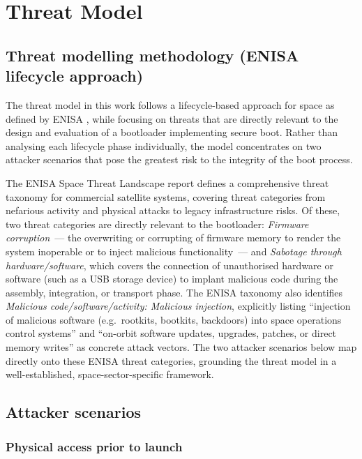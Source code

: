 \chapter{Threat Model}
\label{chapter:threatModel}

\section{Threat modelling methodology (ENISA lifecycle approach)}
\label{section:threatModel-methodology}

The threat model in this work follows a lifecycle-based approach for space as defined by ENISA \cite{enisa_2025}, while focusing on threats that are directly relevant to the design and evaluation of a bootloader implementing secure boot. Rather than analysing each lifecycle phase individually, the model concentrates on two attacker scenarios that pose the greatest risk to the integrity of the boot process.

The ENISA Space Threat Landscape report \cite{enisa_2025} defines a comprehensive threat taxonomy for commercial satellite systems, covering threat categories from nefarious activity and physical attacks to legacy infrastructure risks. Of these, two threat categories are directly relevant to the bootloader: \emph{Firmware corruption}~--- the overwriting or corrupting of firmware memory to render the system inoperable or to inject malicious functionality~--- and \emph{Sabotage through hardware/software}, which covers the connection of unauthorised hardware or software (such as a USB storage device) to implant malicious code during the assembly, integration, or transport phase. The ENISA taxonomy also identifies \emph{Malicious code/software/activity: Malicious injection}, explicitly listing ``injection of malicious software (e.g.~rootkits, bootkits, backdoors) into space operations control systems'' and ``on-orbit software updates, upgrades, patches, or direct memory writes'' as concrete attack vectors. The two attacker scenarios below map directly onto these ENISA threat categories, grounding the threat model in a well-established, space-sector-specific framework.

\section{Attacker scenarios}
\label{section:threatModel-scenarios}

\subsection{Physical access prior to launch}
\label{subsection:threatModel-scenarios-physical}

